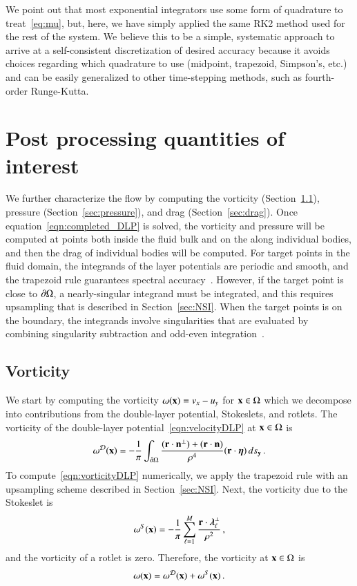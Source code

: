 \documentclass[preprint, 10pt]{elsarticle}
\begin{document}
We point out that most exponential integrators use some form of quadrature to treat~\eqref{eq:mu}, but, here, we have simply applied the same RK2 method used for the rest of the system. We believe this to be a simple, systematic approach to arrive at a self-consistent discretization of desired accuracy because it avoids choices regarding which quadrature to use (midpoint, trapezoid, Simpson's, etc.) and can be easily generalized to other time-stepping methods, such as fourth-order Runge-Kutta. 


\section{Post processing quantities of interest}
\label{s:qoi}
We further characterize the flow by computing the vorticity
(Section~\ref{sec:vorticity}), pressure (Section~\ref{sec:pressure}),
and drag (Section~\ref{sec:drag}).  Once
equation~\eqref{eqn:completed_DLP} is solved, the vorticity and pressure
will be computed at points both inside the fluid bulk and on the
along individual bodies, and then the drag of individual bodies will be computed.  For target points
in the fluid domain, the integrands of the layer potentials are periodic
and smooth, and the trapezoid rule guarantees spectral
accuracy~\cite{tre-wei2014}.  However, if the target point is close to
${\partial} \Omega$, a nearly-singular integrand must be integrated, and this
requires upsampling that is described in Section~\ref{sec:NSI}.  When
the target points is on the boundary, the integrands involve
singularities that are evaluated by combining singularity subtraction
and odd-even integration~\cite{sid-isr1988}.  

\subsection{Vorticity}
\label{sec:vorticity}
We start by computing the vorticity $\omega({\mathbf{x}}) = v_x - u_y$ for ${\mathbf{x}}
\in \Omega$ which we decompose into contributions from the double-layer
potential, Stokeslets, and rotlets.  The vorticity of the double-layer
potential~\eqref{eqn:velocityDLP} at
${\mathbf{x}} \in \Omega$ is
\begin{align}
  \omega^{{\mathcal{D}}}({\mathbf{x}}) = -\frac{1}{\pi}\int_{{\partial}\Omega} 
    \frac{({\mathbf{r}} \cdot {\mathbf{n}}^\perp) + ({\mathbf{r}} \cdot {\mathbf{n}})}{\rho^4}
    ({\mathbf{r}} \cdot {\boldsymbol\eta}) \, ds_{{\mathbf{y}}}\, .
  \label{eqn:vorticityDLP}
\end{align}
To compute~\eqref{eqn:vorticityDLP} numerically, we apply the trapezoid
rule with an upsampling scheme described in Section~\ref{sec:NSI}.
Next, the vorticity due to the Stokeslet is
\begin{align}
  \omega^S({\mathbf{x}}) = -\frac{1}{\pi} \sum_{\ell=1}^{M} 
    \frac{{\mathbf{r}} \cdot {\boldsymbol\lambda}_\ell^\perp}{\rho^2}\, ,
\end{align}
and the vorticity of a rotlet is zero.  Therefore, the vorticity at ${\mathbf{x}}
\in \Omega$ is
\begin{align}
  \omega({\mathbf{x}}) = \omega^{\mathcal{D}}({\mathbf{x}}) + \omega^S({\mathbf{x}})\, .
\end{align}
\end{document}
